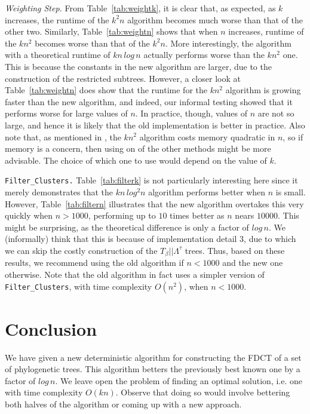 \documentclass{article}
\newcommand{\leafset}{\Lambda}
\newcommand{\TB}{T_\beta}
\begin{document}
    \textit{Weighting Step.} From Table~\ref{tab:weightk}, it is clear that, as expected, as $k$ increases, the runtime of the $k^2n$ algorithm becomes much worse than that of the other two. Similarly, Table~\ref{tab:weightn} shows that when $n$ increases, runtime of the $kn^2$ becomes worse than that of the $k^2n$. More interestingly, the algorithm with a theoretical runtime of $kn\,log\,n$ actually performs worse than the $kn^2$ one. This is because the constants in the new algorithm are larger, due to the construction of the restricted subtrees. However, a closer look at Table~\ref{tab:weightn} does show that the runtime for the $kn^2$ algorithm is growing faster than the new algorithm, and indeed, our informal testing showed that it performs worse for large values of $n$. In practice, though, values of $n$ are not so large, and hence it is likely that the old implementation is better in practice. Also note that, as mentioned in \cite{jansson2018algorithms}, the $kn^2$ algorithm costs memory quadratic in $n$, so if memory is a concern, then using on of the other methods might be more advisable. The choice of which one to use would depend on the value of $k$.

    \texttt{Filter\_Clusters.} Table~\ref{tab:filterk} is not particularly interesting here since it merely demonstrates that the $kn\,log^2n$ algorithm performs better when $n$ is small. However, Table~\ref{tab:filtern} illustrates that the new algorithm overtakes this very quickly when $n > 1000$, performing up to $10$ times better as $n$ nears $10000$. This might be surprising, as the theoretical difference is only a factor of $log\,n$. We (informally) think that this is because of implementation detail 3, due to which we can skip the costly construction of the $\TB||\leafset^{\tau}$ trees. Thus, based on these results, we recommend using the old algorithm if $n < 1000$ and the new one otherwise. Note that the old algorithm in fact uses a simpler version of \texttt{Filter\_Clusters}, with time complexity $O(n^2)$, when $n < 1000$.

    \section{Conclusion}
    We have given a new deterministic algorithm for constructing the FDCT of a set of phylogenetic trees. This algorithm betters the previously best known one by a factor of $log\,n$. We leave open the problem of finding an optimal solution, i.e. one with time complexity $O(kn)$. Observe that doing so would involve bettering both halves of the algorithm or coming up with a new approach.

    \newpage
    
    
\end{document}
